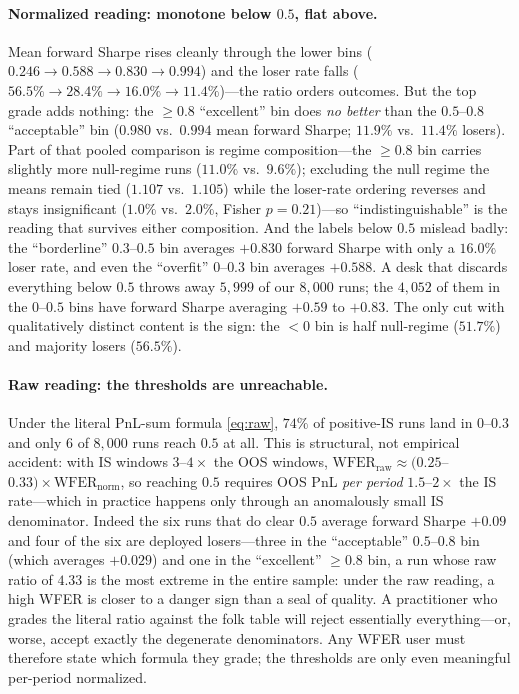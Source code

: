 \documentclass[11pt]{article}
\newcommand{\wfer}{\mathrm{WFER}}
\begin{document}
\paragraph{Normalized reading: monotone below $0.5$, flat above.} Mean
forward Sharpe rises cleanly through the lower bins ($0.246 \to 0.588 \to
0.830 \to 0.994$) and the loser rate falls ($56.5\% \to 28.4\% \to 16.0\% \to
11.4\%$)---the ratio orders outcomes. But the top grade adds nothing: the
$\ge 0.8$ ``excellent'' bin does \emph{no better} than the $0.5$--$0.8$
``acceptable'' bin ($0.980$ vs.\ $0.994$ mean forward Sharpe; $11.9\%$ vs.\
$11.4\%$ losers). Part of that pooled comparison is regime composition---the
$\ge 0.8$ bin carries slightly more null-regime runs ($11.0\%$ vs.\ $9.6\%$);
excluding the null regime the means remain tied ($1.107$ vs.\ $1.105$) while
the loser-rate ordering reverses and stays insignificant ($1.0\%$ vs.\
$2.0\%$, Fisher $p = 0.21$)---so ``indistinguishable'' is the reading that
survives either composition. And the labels below $0.5$ mislead badly: the
``borderline'' $0.3$--$0.5$ bin averages $+0.830$ forward Sharpe with only a
$16.0\%$ loser rate, and even the ``overfit'' $0$--$0.3$ bin averages
$+0.588$. A desk that discards everything below $0.5$ throws away
$5{,}999$ of our $8{,}000$ runs; the $4{,}052$ of them in the $0$--$0.5$
bins have forward Sharpe averaging $+0.59$ to $+0.83$. The only cut with qualitatively distinct content is the sign: the
$<0$ bin is half null-regime ($51.7\%$) and majority losers ($56.5\%$).

\paragraph{Raw reading: the thresholds are unreachable.} Under the literal
PnL-sum formula \eqref{eq:raw}, $74\%$ of positive-IS runs land in
$0$--$0.3$ and only $6$ of $8{,}000$ runs reach $0.5$ at all. This is
structural, not empirical accident: with IS windows $3$--$4\times$ the OOS
windows, $\wfer_{\mathrm{raw}} \approx (0.25$--$0.33) \times
\wfer_{\mathrm{norm}}$, so reaching $0.5$ requires OOS PnL \emph{per period}
$1.5$--$2\times$ the IS rate---which in practice happens only through an
anomalously small IS denominator. Indeed the six runs that do clear $0.5$
average forward Sharpe $+0.09$ and four of the six are deployed
losers---three in the ``acceptable'' $0.5$--$0.8$ bin (which averages
$+0.029$) and one in the ``excellent'' $\ge 0.8$ bin, a run whose raw ratio
of $4.33$ is the most extreme in the entire sample: under the raw reading, a
high WFER is closer to a danger sign than a seal of quality.
A practitioner who grades the literal ratio against the folk table will
reject essentially everything---or, worse, accept exactly the degenerate
denominators. Any WFER user must therefore state which formula they grade;
the thresholds are only even meaningful per-period normalized.
\end{document}
